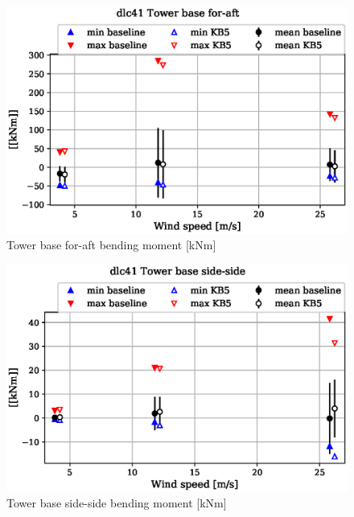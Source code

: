\begin{figure}[!ht]
\begin{center}
	\includegraphics[width=.85\linewidth]{figures/baseline-vs-KB6/dlc41/tower-tower-node-001-momentvec-x_AA0007_AA0003.eps}
\end{center}
\caption{Tower base for-aft bending moment [kNm]}
\label{fig:baseline-vs-KB6:dlc41:tower-base-fa}
\end{figure}

\begin{figure}[!ht]
\begin{center}
	\includegraphics[width=.85\linewidth]{figures/baseline-vs-KB6/dlc41/tower-tower-node-001-momentvec-y_AA0007_AA0003.eps}
\end{center}
\caption{Tower base side-side bending moment [kNm]}
\label{fig:baseline-vs-KB6:dlc41:tower-base-ss}
\end{figure}

